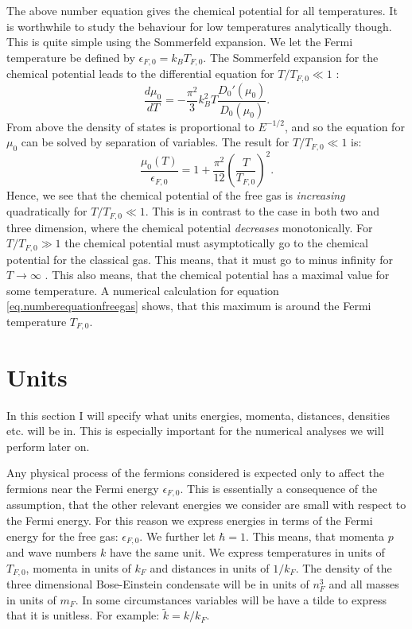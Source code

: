 The above number equation gives the chemical potential for all temperatures. It is worthwhile to study the behaviour for low temperatures analytically though. This is quite simple using the Sommerfeld expansion. We let the Fermi temperature be defined by $\epsilon_{F,0} = k_B T_{F,0}$. The Sommerfeld expansion for the chemical potential leads to the differential equation for $T/T_{F,0} \ll 1$ \cite{GiuseppeGiuseppe}:
\begin{equation}
\frac{d\mu_0}{dT} = -\frac{\pi^2}{3}k_B^2 T \frac{D_0'(\mu_0)}{D_0(\mu_0)}. \nonumber
\end{equation}
From above the density of states is proportional to $E^{-1/2}$, and so the equation for $\mu_0$ can be solved by separation of variables. The result for $T/T_{F,0}\ll 1$ is:
\begin{equation}
\frac{\mu_0(T)}{\epsilon_{F,0}} = 1 + \frac{\pi^2}{12}\left(\frac{T}{T_{F,0}}\right)^2.
\end{equation}
Hence, we see that the chemical potential of the free gas is \textit{increasing} quadratically for $T/T_{F,0} \ll 1$. This is in contrast to the case in both two and three dimension, where the chemical potential \textit{decreases} monotonically. For $T/T_{F,0} \gg 1$ the chemical potential must asymptotically go to the chemical potential for the classical gas. This means, that it must go to minus infinity for $T\to \infty$ \cite{SchroederThermal}. This also means, that the chemical potential has a maximal value for some temperature. A numerical calculation for equation \eqref{eq.numberequationfreegas} shows, that this maximum is around the Fermi temperature $T_{F,0}$. 

\section{Units}
In this section I will specify what units energies, momenta, distances, densities etc. will be in. This is especially important for the numerical analyses we will perform later on. 

Any physical process of the fermions considered is expected only to affect the fermions near the Fermi energy $\epsilon_{F,0}$. This is essentially a consequence of the assumption, that the other relevant energies we consider are small with respect to the Fermi energy. For this reason we express energies in terms of the Fermi energy for the free gas: $\epsilon_{F,0}$. We further let $\hbar = 1$. This means, that momenta $p$ and wave numbers $k$ have the same unit. We express temperatures in units of $T_{F,0}$, momenta in units of $k_F$ and distances in units of $1/k_F$. The density of the three dimensional Bose-Einstein condensate will be in units of $n_F^3$ and all masses in units of $m_F$. In some circumstances variables will be have a tilde to express that it is unitless. For example: $\tilde{k} = k/k_F$.

